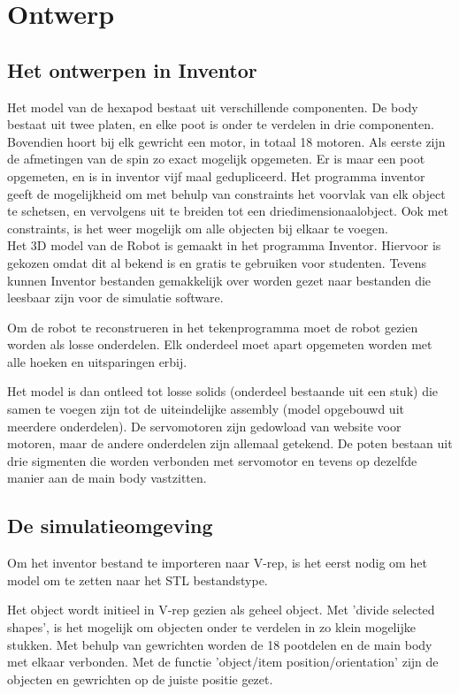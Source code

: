\documentclass[10pt,a4paper]{article}
\begin{document}
\section{Ontwerp}

\subsection{Het ontwerpen in Inventor}
Het model van de hexapod bestaat uit verschillende componenten. De body bestaat uit twee platen, en elke poot is onder te verdelen in drie componenten. Bovendien hoort bij elk gewricht een motor, in totaal 18 motoren. Als eerste zijn de afmetingen van de spin zo exact mogelijk opgemeten. Er is maar een poot opgemeten, en is in inventor vijf maal gedupliceerd. Het programma inventor geeft de mogelijkheid om met behulp van constraints het voorvlak van elk object te schetsen, en vervolgens uit te breiden tot een driedimensionaalobject. Ook met constraints, is het weer mogelijk om alle objecten bij elkaar te voegen.\\

Het 3D model van de Robot is gemaakt in het programma Inventor. Hiervoor is gekozen omdat dit al bekend is en gratis te gebruiken voor studenten. Tevens kunnen Inventor bestanden gemakkelijk over worden gezet naar bestanden die leesbaar zijn voor de simulatie software.
 
Om de robot te reconstrueren in het tekenprogramma moet de robot gezien worden als losse onderdelen. Elk onderdeel moet apart opgemeten worden met alle hoeken en uitsparingen erbij.

Het model is dan ontleed tot losse solids (onderdeel bestaande uit een stuk) die samen te voegen zijn tot de uiteindelijke assembly (model opgebouwd uit meerdere onderdelen).
De servomotoren zijn gedowload van website voor motoren, maar de andere onderdelen zijn allemaal getekend. De poten bestaan uit drie sigmenten die worden verbonden met servomotor en tevens op dezelfde manier aan de main body vastzitten. \\



\subsection{De simulatieomgeving}
Om het inventor bestand te importeren naar V-rep, is het eerst nodig om het model om te zetten naar het STL bestandstype.

Het object wordt initieel in V-rep gezien als geheel object. Met 'divide selected shapes', is het mogelijk om objecten onder te verdelen in zo klein mogelijke stukken. Met behulp van gewrichten worden de 18 pootdelen en de main body met elkaar verbonden. Met de functie 'object/item position/orientation' zijn de objecten en gewrichten op de juiste positie gezet.
\end{document}

